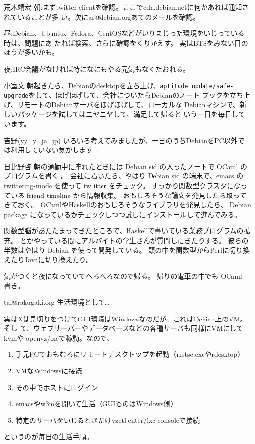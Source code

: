 \begin{frame}{荒木靖宏}
朝:まずtwitter clientを確認。ここでcdn.debian.netに何かあれば通知されていることが多
い。次にar@debian.orgあてのメールを確認。

昼:Debian、Ubuntu、Fedora、CentOSなどがいりまじった環境をいじっている時は、問題にあ
たれば検索、さらに確認をくりかえす。
実はBTSをみない日のほうが多いかも。

夜:IRC会議がなければ特になにもやる元気もなくたおれる。
\end{frame}

\begin{frame}{小室文}
朝起きたら、Debianのdesktopを立ち上げ、\texttt{aptitude
 update/safe-upgrade}をして、ほげほげして、会社についたらDebianのノート
 ブックを立ち上げ、リモートのDebianサーバをほげほげして、ローカルな
 Debianマシンで、新しいパッケージを試してはニヤニヤして、満足して帰ると
 いう一日を毎日しています。
\end{frame}

\begin{frame}{吉野(yy\_y\_ja\_jp)}
いろいろ考えてみましたが、一日のうちDebianをPC以外では利用していない気がします...
\end{frame}

\begin{frame}{日比野啓}
朝の通勤中に座れたときには Debian sid の入ったノートで OCaml のプログラムを書く
。
会社に着いたら、やはり Debian sid の端末で、emacs の twittering-mode を使って tw
itter をチェック。
すっかり関数型クラスタになっている friend timeline から情報収集。
おもしろそうな論文を発見したら取ってきておく。
OCamlやHaskellのおもしろそうなライブラリを発見したら、
Debian package になっているかチェックしつつ試しにインストールして遊んでみる。

関数型脳があたたまってきたところで、Haskellで書いている業務プログラムの拡充。
とかやっている間にアルバイトの学生さんが質問しにきたりする。
彼らの半数はやはり Debian を使って開発している。
頭の中を関数型からPerlに切り換えたりJavaに切り換えたり。

気がつくと夜になっていてへろへろなので帰る。
帰りの電車の中でも OCaml 書き。
\end{frame}

\begin{frame}{tai@rakugaki.org}
 生活環境として…

 実はXは見切りをつけてGUI環境はWindowsなのだが、これはDebian上のVM。そし
 て、ウェブサーバーやデータベースなどの各種サーバも同様にVMにしてkvmや
 openvz/lxcで稼動。なので、

 \begin{enumerate}
  \item 手元PCでおもむろにリモートデスクトップを起動（mstsc.exeやrdesktop）
  \item VMなWindowsに接続
  \item その中でホストにログイン
  \item emacsやw3mを開いて生活（GUIものはWindows側）
  \item 特定のサーバをいじるときだけvzctl enter/lxc-consoleで接続
 \end{enumerate}
 というのが毎日の生活手順。
\end{frame}


